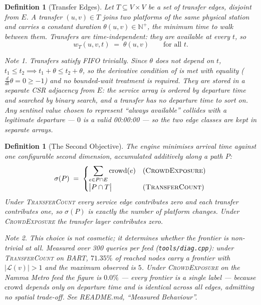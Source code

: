 \documentclass[11pt, a4paper]{article}
\newtheorem{definition}[theorem]{Definition}
\theoremstyle{remark}
\newtheorem*{note}{Note}
\newcommand{\N}{\mathbb{N}}
\newcommand{\crowd}{\mathrm{crowd}}
\begin{document}
\begin{definition}[Transfer Edges]
    \label{def:transfer}
    Let $T \subseteq V \times V$ be a set of \emph{transfer edges}, disjoint from
    $E$. A transfer $(u,v) \in T$ joins two platforms of the same physical
    station and carries a constant duration $\theta(u,v) \in \N^+$, the minimum
    time to walk between them. Transfers are \emph{time-independent}: they are
    available at every $t$, so
    \[
        w_T(u, v, t) \;=\; \theta(u,v) \qquad \text{for all } t .
    \]

    \begin{note}
    Transfers satisfy FIFO trivially. Since $\theta$ does not depend on $t$,
    $t_1 \le t_2 \implies t_1 + \theta \le t_2 + \theta$, so the derivative
    condition of  is met with equality
    ($\frac{d}{dt}\theta = 0 \ge -1$) and no bounded-wait treatment is required.
    They are stored in a separate CSR adjacency from $E$: the service array is
    ordered by departure time and searched by binary search, and a transfer has
    no departure time to sort on. Any sentinel value chosen to represent
    ``always available'' collides with a legitimate departure --- $0$ is a valid
    00:00:00 --- so the two edge classes are kept in separate arrays.
    \end{note}
\end{definition}

\begin{definition}[The Second Objective]
    \label{def:second-objective}
    The engine minimises arrival time against one configurable second dimension,
    accumulated additively along a path $P$:
    \[
        \sigma(P) \;=\;
        \begin{cases}
            \displaystyle\sum_{e \in P \cap E} \crowd(e)
                & \text{(\textsc{CrowdExposure})}\\[2ex]
            \bigl| P \cap T \bigr|
                & \text{(\textsc{TransferCount})}
        \end{cases}
    \]
    Under \textsc{TransferCount} every service edge contributes zero and each
    transfer contributes one, so $\sigma(P)$ is exactly the number of platform
    changes. Under \textsc{CrowdExposure} the transfer layer contributes zero.

    \begin{note}
    This choice is not cosmetic; it determines whether the frontier is
    non-trivial at all. Measured over 300 queries per feed
    (\texttt{tools/diag.cpp}): under \textsc{TransferCount} on BART, $71.35\%$ of
    reached nodes carry a frontier with $|\mathcal{L}(v)| > 1$ and the maximum
    observed is $5$. Under \textsc{CrowdExposure} on the Namma Metro feed the
    figure is $0.0\%$ --- every frontier is a single label --- because
    $\crowd$ depends only on departure time and is identical across all edges,
    admitting no spatial trade-off. See README.md, ``Measured Behaviour''.
    \end{note}
\end{definition}
\end{document}
